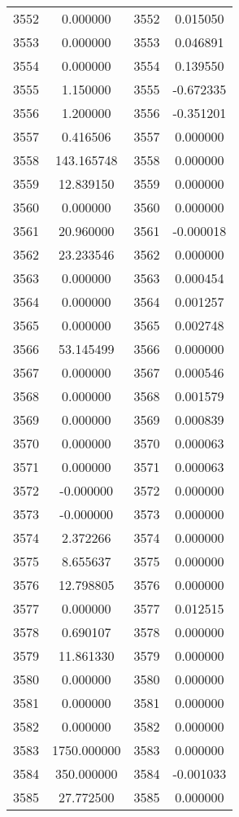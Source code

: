 \documentclass[12pt]{article}
\begin{document}
\begin{longtable}{@{}cccc@{}}
3552 & 0.000000 & 3552 & 0.015050 \\
3553 & 0.000000 & 3553 & 0.046891 \\
3554 & 0.000000 & 3554 & 0.139550 \\
3555 & 1.150000 & 3555 & -0.672335 \\
3556 & 1.200000 & 3556 & -0.351201 \\
3557 & 0.416506 & 3557 & 0.000000 \\
3558 & 143.165748 & 3558 & 0.000000 \\
3559 & 12.839150 & 3559 & 0.000000 \\
3560 & 0.000000 & 3560 & 0.000000 \\
3561 & 20.960000 & 3561 & -0.000018 \\
3562 & 23.233546 & 3562 & 0.000000 \\
3563 & 0.000000 & 3563 & 0.000454 \\
3564 & 0.000000 & 3564 & 0.001257 \\
3565 & 0.000000 & 3565 & 0.002748 \\
3566 & 53.145499 & 3566 & 0.000000 \\
3567 & 0.000000 & 3567 & 0.000546 \\
3568 & 0.000000 & 3568 & 0.001579 \\
3569 & 0.000000 & 3569 & 0.000839 \\
3570 & 0.000000 & 3570 & 0.000063 \\
3571 & 0.000000 & 3571 & 0.000063 \\
3572 & -0.000000 & 3572 & 0.000000 \\
3573 & -0.000000 & 3573 & 0.000000 \\
3574 & 2.372266 & 3574 & 0.000000 \\
3575 & 8.655637 & 3575 & 0.000000 \\
3576 & 12.798805 & 3576 & 0.000000 \\
3577 & 0.000000 & 3577 & 0.012515 \\
3578 & 0.690107 & 3578 & 0.000000 \\
3579 & 11.861330 & 3579 & 0.000000 \\
3580 & 0.000000 & 3580 & 0.000000 \\
3581 & 0.000000 & 3581 & 0.000000 \\
3582 & 0.000000 & 3582 & 0.000000 \\
3583 & 1750.000000 & 3583 & 0.000000 \\
3584 & 350.000000 & 3584 & -0.001033 \\
3585 & 27.772500 & 3585 & 0.000000 \\

\end{longtable}
\end{document}
